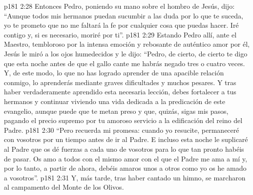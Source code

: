 \vs p181 2:28 Entonces Pedro, poniendo su mano sobre el hombro de Jesús, dijo: “Aunque todos mis hermanos puedan sucumbir a las duda por lo que te suceda, yo te prometo que no me faltará la fe por cualquier cosa que puedas hacer. Iré contigo y, si es necesario, moriré por ti”.
\vs p181 2:29 Estando Pedro allí, ante el Maestro, tembloroso por la intensa emoción y rebosante de auténtico amor por él, Jesús le miró a los ojos humedecidos y le dijo: “Pedro, de cierto, de cierto te digo que esta noche antes de que el gallo cante me habrás negado tres o cuatro veces. Y, de este modo, lo que no has logrado aprender de una apacible relación conmigo, lo aprenderás mediante graves dificultades y muchos pesares. Y tras haber verdaderamente aprendido esta necesaria lección, debes fortalecer a tus hermanos y continuar viviendo una vida dedicada a la predicación de este evangelio, aunque puede que te metan preso y que, quizás, sigas mis pasos, pagando el precio supremo por tu amoroso servicio a la edificación del reino del Padre.
\vs p181 2:30 “Pero recuerda mi promesa: cuando yo resucite, permaneceré con vosotros por un tiempo antes de ir al Padre. E incluso esta noche le suplicaré al Padre que os dé fuerzas a cada uno de vosotros para lo que tan pronto habéis de pasar. Os amo a todos con el mismo amor con el que el Padre me ama a mí y, por lo tanto, a partir de ahora, debéis amaros unos a otros como yo os he amado a vosotros”.
\vs p181 2:31 \pc Y, más tarde, tras haber cantado un himno, se marcharon al campamento del Monte de los Olivos.
